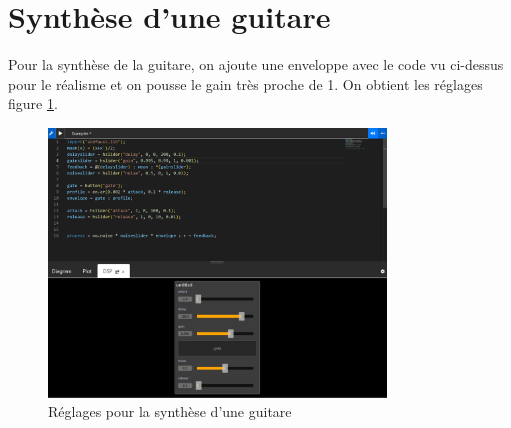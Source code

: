 \documentclass[12pt]{report}
\begin{document}
\section{Synthèse d'une guitare}

Pour la synthèse de la guitare, on ajoute une enveloppe avec le code vu ci-dessus pour le réalisme et on %
pousse le gain très proche de 1. On obtient les réglages figure \ref{fig:guitar}.

\begin{figure}
    \centering
    \includegraphics[width=0.8\textwidth]{imgs/guitare.png}
    \caption{Réglages pour la synthèse d'une guitare}
    \label{fig:guitar}
\end{figure}
\end{document}
